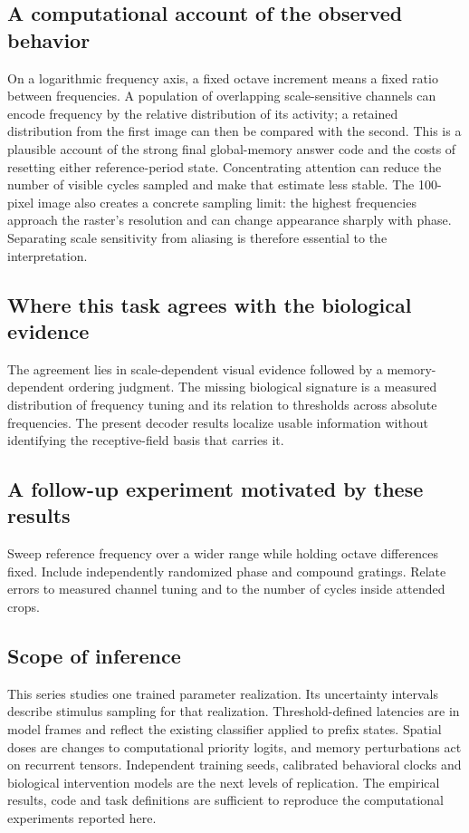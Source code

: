 \documentclass[11pt]{article}
\begin{document}
\subsection{A computational account of the observed behavior}
On a logarithmic frequency axis, a fixed octave increment means a fixed ratio between frequencies. A population of overlapping scale-sensitive channels can encode frequency by the relative distribution of its activity; a retained distribution from the first image can then be compared with the second. This is a plausible account of the strong final global-memory answer code and the costs of resetting either reference-period state. Concentrating attention can reduce the number of visible cycles sampled and make that estimate less stable. The 100-pixel image also creates a concrete sampling limit: the highest frequencies approach the raster’s resolution and can change appearance sharply with phase. Separating scale sensitivity from aliasing is therefore essential to the interpretation.

\subsection{Where this task agrees with the biological evidence}
The agreement lies in scale-dependent visual evidence followed by a memory-dependent ordering judgment. The missing biological signature is a measured distribution of frequency tuning and its relation to thresholds across absolute frequencies. The present decoder results localize usable information without identifying the receptive-field basis that carries it.

\subsection{A follow-up experiment motivated by these results}
Sweep reference frequency over a wider range while holding octave differences fixed. Include independently randomized phase and compound gratings. Relate errors to measured channel tuning and to the number of cycles inside attended crops.
\subsection{Scope of inference}
This series studies one trained parameter realization. Its uncertainty intervals describe stimulus sampling for that realization. Threshold-defined latencies are in model frames and reflect the existing classifier applied to prefix states. Spatial doses are changes to computational priority logits, and memory perturbations act on recurrent tensors. Independent training seeds, calibrated behavioral clocks and biological intervention models are the next levels of replication. The empirical results, code and task definitions are sufficient to reproduce the computational experiments reported here.
\end{document}
